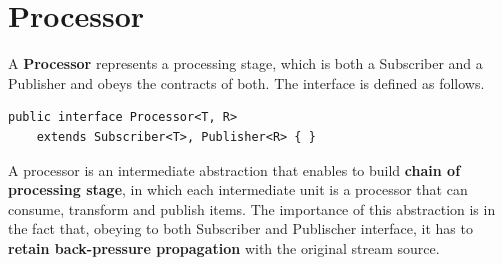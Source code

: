 \section{Processor}\label{processor}

A \textbf{Processor} represents a processing stage, which is both a
Subscriber and a Publisher and obeys the contracts of both. The
interface is defined as follows.

\begin{verbatim}
public interface Processor<T, R>
    extends Subscriber<T>, Publisher<R> { }
\end{verbatim}

A processor is an intermediate abstraction that enables to build
\textbf{chain of processing stage}, in which each intermediate unit is a
processor that can consume, transform and publish items. The importance
of this abstraction is in the fact that, obeying to both Subscriber and
Publischer interface, it has to \textbf{retain back-pressure
propagation} with the original stream source.
